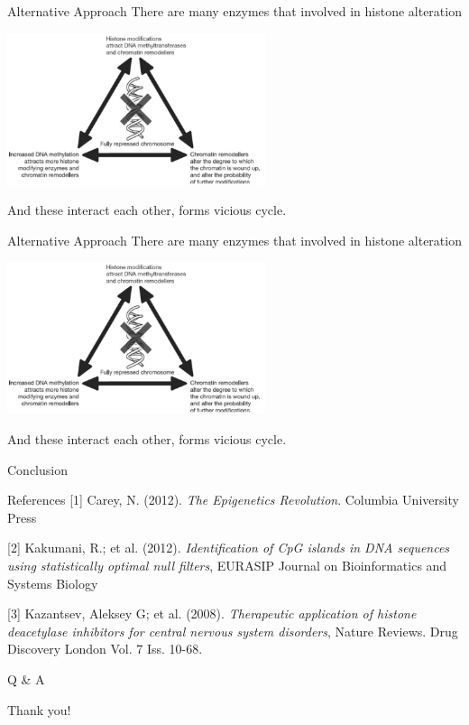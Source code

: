 \documentclass{beamer}
\begin{document}
    \begin{frame}{Alternative Approach}
        There are many enzymes that involved in histone alteration

        \begin{center}
        \includegraphics[height=12em]{model}
        \end{center}

        And these interact each other, forms vicious cycle.
    \end{frame}

    \begin{frame}{Alternative Approach}
        There are many enzymes that involved in histone alteration

        \begin{center}
        \includegraphics[height=12em]{model}
        \end{center}

        And these interact each other, forms vicious cycle.
    \end{frame}

    \begin{frame}{Conclusion}

    \end{frame}

    \begin{frame}{References}
        \footnotesize [1] Carey, N. (2012). \textit{The Epigenetics Revolution}. Columbia University Press
    
        \footnotesize [2] Kakumani, R.; et al. (2012). \textit{Identification of CpG islands in DNA sequences using statistically optimal null filters}, EURASIP Journal on Bioinformatics and Systems Biology 
    
        \footnotesize [3] Kazantsev, Aleksey G; et al. (2008). \textit{Therapeutic application of histone deacetylase inhibitors for central nervous system disorders}, Nature Reviews. Drug Discovery\; London Vol. 7 Iss. 10-68.
    \end{frame}

    \begin{frame}[plain]
        \centering
        \huge Q \& A
    \end{frame}

    \begin{frame}[plain]
        \centering
        \huge Thank you!
    \end{frame}
\end{document}
